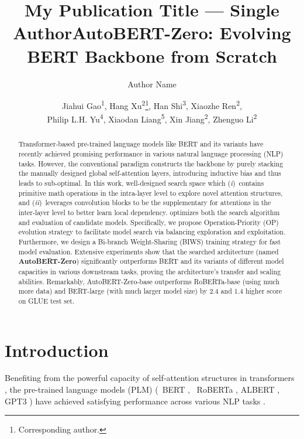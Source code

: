 \documentclass[letterpaper]{article} \usepackage{aaai22}  \usepackage{times}  \usepackage{helvet}  \usepackage{courier}  \usepackage[hyphens]{url}  \usepackage{graphicx} \urlstyle{rm} \def\UrlFont{\rm}  \usepackage{natbib}  \usepackage{caption} \DeclareCaptionStyle{ruled}{labelfont=normalfont,labelsep=colon,strut=off} \frenchspacing  \setlength{\pdfpagewidth}{8.5in}  \setlength{\pdfpageheight}{11in}  \usepackage{algorithm}
\title{My Publication Title --- Single Author}
\author {
    Author Name
}
\title{AutoBERT-Zero: Evolving BERT Backbone from Scratch}
\author {
Jiahui Gao\textsuperscript{\rm 1},
    Hang Xu\textsuperscript{\rm 2}\thanks{Corresponding author.},
    Han Shi\textsuperscript{\rm 3},
    Xiaozhe Ren\textsuperscript{\rm 2}, \\
    Philip L.H. Yu\textsuperscript{\rm 4},
    Xiaodan Liang\textsuperscript{\rm 5},
    Xin Jiang\textsuperscript{\rm 2},
    Zhenguo Li\textsuperscript{\rm 2}
}
\newcommand{\Ni}{({\em i})~}
\newcommand{\Nii}{({\em ii})~}
\begin{document}
\maketitle

\begin{abstract}
Transformer-based pre-trained language models like BERT and its variants have recently achieved promising performance in various natural language processing (NLP) tasks. However, the conventional paradigm constructs the backbone by purely stacking the manually designed global self-attention layers, introducing inductive bias and thus leads to sub-optimal. In this work, 
well-designed search space which \Ni contains primitive math operations in the intra-layer level to explore novel attention structures, and \Nii leverages convolution blocks to be the supplementary for attentions in the inter-layer level to better learn local dependency.
optimizes both the search algorithm and evaluation of candidate models.
Specifically, we propose Operation-Priority (OP) evolution strategy to facilitate model search via balancing exploration and exploitation.
Furthermore, we design a Bi-branch Weight-Sharing (BIWS) training strategy for fast model evaluation.
Extensive experiments show that the searched architecture (named \textbf{AutoBERT-Zero}) significantly outperforms BERT and its variants of different model capacities in various downstream tasks, proving the architecture's transfer and scaling abilities. Remarkably, AutoBERT-Zero-base outperforms RoBERTa-base (using much more data) and BERT-large (with much larger model size) by 2.4 and 1.4 higher score on GLUE test set.
\end{abstract}




\section{Introduction} \label{sec:intro}
Benefiting from the powerful capacity of self-attention structures in transformers \citep{vaswani2017attention}, the pre-trained language models (PLM) (\eg\ BERT \citep{devlin2019bert}, \ RoBERTa \citep{liu2019roberta}, ALBERT \citep{lan2019albert}, GPT3 \citep{brown2020language}) have achieved satisfying performance across various NLP tasks \citep{wang2018glue,rajpurkar-etal-2016-squad,rajpurkar2018know,zellers-etal-2018-swag}. 
\end{document}
